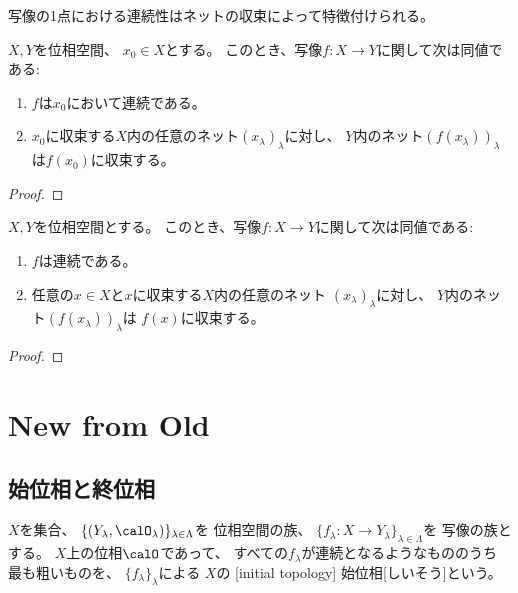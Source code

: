 \documentclass[report]{jlreq}
\begin{document}
写像の1点における連続性はネットの収束によって特徴付けられる。

\begin{theorem}[1点における連続性の特徴付け]
    $X, Y$を位相空間、
    $x_0 \in X$とする。
    このとき、写像$f \colon X \to Y$に関して次は同値である:
    \begin{enumerate}
        \item $f$は$x_0$において連続である。
        \item $x_0$に収束する$X$内の任意のネット$(x_\lambda)_\lambda$に対し、
            $Y$内のネット$(f(x_\lambda))_\lambda$は$f(x_0)$に収束する。
    \end{enumerate}
\end{theorem}

\begin{proof}
    \TODO{}
\end{proof}

\begin{corollary}[連続写像の特徴付け]
    $X, Y$を位相空間とする。
    このとき、写像$f \colon X \to Y$に関して次は同値である:
    \begin{enumerate}
        \item $f$は連続である。
        \item 任意の$x \in X$と$x$に収束する$X$内の任意のネット
            $(x_\lambda)_\lambda$に対し、
            $Y$内のネット$(f(x_\lambda))_\lambda$は
            $f(x)$に収束する。
    \end{enumerate}
\end{corollary}

\begin{proof}
    \TODO{}
\end{proof}



%
\chapter{New from Old}

%
\section{始位相と終位相}

\begin{definition}[始位相]
    $X$を集合、
    $\{ (Y_\lambda, \calO_\lambda) \}_{\lambda \in \Lambda}$を
    位相空間の族、
    $\{ f_\lambda \colon X \to Y_\lambda \}_{\lambda \in \Lambda}$を
    写像の族とする。
    $X$上の位相$\calO$であって、
    すべての$f_\lambda$が連続となるようなもののうち
    最も粗いものを、
    $\{ f_\lambda \}_\lambda$による
    $X$の
    [initial topology]
        {始位相}[しいそう]という。
\end{definition}
\end{document}
